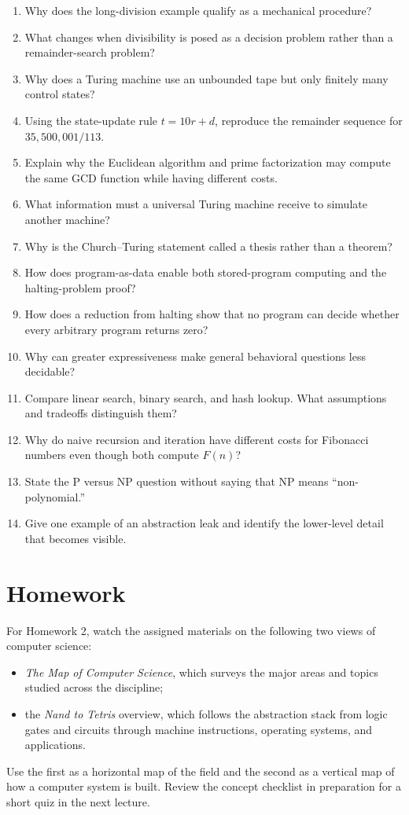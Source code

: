 \documentclass[11pt]{article}
\begin{document}
\begin{enumerate}
  \item Why does the long-division example qualify as a mechanical procedure?
  \item What changes when divisibility is posed as a decision problem rather than a remainder-search problem?
  \item Why does a Turing machine use an unbounded tape but only finitely many control states?
  \item Using the state-update rule $t=10r+d$, reproduce the remainder sequence for $35{,}500{,}001/113$.
  \item Explain why the Euclidean algorithm and prime factorization may compute the same GCD function while having different costs.
  \item What information must a universal Turing machine receive to simulate another machine?
  \item Why is the Church--Turing statement called a thesis rather than a theorem?
  \item How does program-as-data enable both stored-program computing and the halting-problem proof?
  \item How does a reduction from halting show that no program can decide whether every arbitrary program returns zero?
  \item Why can greater expressiveness make general behavioral questions less decidable?
  \item Compare linear search, binary search, and hash lookup. What assumptions and tradeoffs distinguish them?
  \item Why do naive recursion and iteration have different costs for Fibonacci numbers even though both compute $F(n)$?
  \item State the P versus NP question without saying that NP means ``non-polynomial.''
  \item Give one example of an abstraction leak and identify the lower-level detail that becomes visible.
\end{enumerate}

\section*{Homework}
For Homework 2, watch the assigned materials on the following two views of
computer science:
\begin{itemize}
  \item \emph{The Map of Computer Science}, which surveys the major areas and
  topics studied across the discipline;
  \item the \emph{Nand to Tetris} overview, which follows the abstraction stack
  from logic gates and circuits through machine instructions, operating systems,
  and applications.
\end{itemize}
Use the first as a horizontal map of the field and the second as a vertical map
of how a computer system is built. Review the concept checklist in preparation
for a short quiz in the next lecture.
\end{document}
